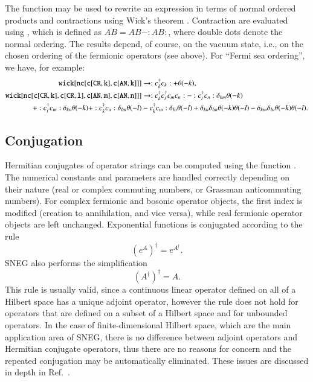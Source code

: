 \documentclass[3p,number,preprint]{elsarticle}
\begin{document}
The function  may be used to rewrite an expression in terms of
normal ordered products and contractions using Wick's theorem
\cite{wick1950}. Contraction are evaluated using
, which is defined as $\overline{AB}=AB-:AB:$, where
double dots denote the normal ordering. The results depend, of course,
on the vacuum state, i.e., on the chosen ordering of the fermionic
operators (see above). For ``Fermi sea ordering'', we have, for
example:
%
\begin{equation}
\begin{split}
{\tt wick[nc[c[CR,k],c[AN,k]]]} &\to : c^\dag_k c_k : + \theta(-k),\\
{\tt wick[nc[c[CR,k],c[CR,l],c[AN,m],c[AN,n]]]}
&\to 
:c^\dag_k c^\dag_l c_m c_n:
-
:c^\dag_l c_n: \delta_{km} \theta(-k) \\
+
:c^\dag_l c_m: \delta_{kn} \theta(-k)
+
:c^\dag_k c_n: \delta_{lm} \theta(-l)
&-
c^\dag_k c_m: \delta_{ln} \theta(-l)
+
\delta_{kn} \delta_{lm} \theta(-k)\theta(-l)
-
\delta_{km} \delta_{ln} \theta(-k)\theta(-l).
\end{split}
\end{equation}



\subsection{Conjugation}

Hermitian conjugates of operator strings can be computed using the
function . The numerical constants and parameters are
handled correctly depending on their nature (real or complex commuting
numbers, or Grassman anticommuting numbers). For complex fermionic and
bosonic operator objects, the first index is modified (creation to
annihilation, and vice versa), while real fermionic operator objects
are left unchanged. Exponential functions is conjugated according to
the rule
%
\begin{equation}
\left( e^{A} \right)^\dag = e^{A^\dag}.
\end{equation}
%
SNEG also performs the simplification
%
\begin{equation}
\left(A^\dag\right)^\dag = A.
\end{equation}
%
This rule is usually valid, since a continuous linear operator defined
on all of a Hilbert space has a unique adjoint operator, however the
rule does not hold for operators that are defined on a subset of a
Hilbert space and for unbounded operators. In the case of
finite-dimensional Hilbert space, which are the main application area
of SNEG, there is no difference between adjoint operators and
Hermitian conjugate operators, thus there are no reasons for concern
and the repeated conjugation may be automatically eliminated. These
issues are discussed in depth in Ref.~\cite{gieres1999}.
\end{document}
